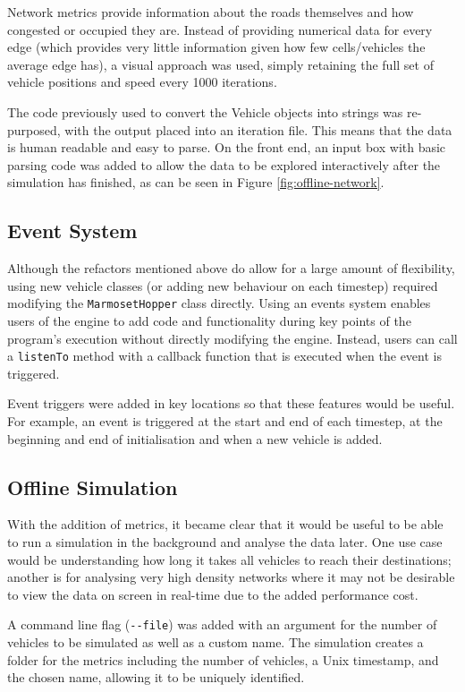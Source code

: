 \documentclass[ %
                    author={Alexander Hill},
                supervisor={Dr. Benjamin Sach},
                    degree={MEng},
                     title={MARMOSET},
                  subtitle={Multi-Agent Route Management using Online Simulation for Efficient Transportation},
                      type={research},
                      year={2016} ]{dissertation}
\begin{document}
Network metrics provide information about the roads themselves and how congested
or occupied they are. Instead of providing numerical data for every edge (which
provides very little information given how few cells/vehicles the average edge
has), a visual approach was used, simply retaining the full set of vehicle
positions and speed every 1000 iterations.

The code previously used to convert the Vehicle objects into strings was
re-purposed, with the output placed into an iteration file. This means that the
data is human readable and easy to parse. On the front end, an input box with
basic parsing code was added to allow the data to be explored interactively
after the simulation has finished, as can be seen in Figure
\ref{fig:offline-network}.

\subsection{Event System}

Although the refactors mentioned above do allow for a large amount of
flexibility, using new vehicle classes (or adding new behaviour on each
timestep) required modifying the \texttt{MarmosetHopper} class directly. Using
an events system enables users of the engine to add code and functionality
during key points of the program's execution without directly modifying the
engine.  Instead, users can call a \texttt{listenTo} method with a callback
function that is executed when the event is triggered.

Event triggers were added in key locations so that these features would be
useful. For example, an event is triggered at the start and end of each
timestep, at the beginning and end of initialisation and when a new vehicle is
added.

\subsection{Offline Simulation}

With the addition of metrics, it became clear that it would be useful to be able
to run a simulation in the background and analyse the data later. One use case
would be understanding how long it takes all vehicles to reach their
destinations; another is for analysing very high density networks where it may
not be desirable to view the data on screen in real-time due to the added
performance cost.

A command line flag (\texttt{-{}-file}) was added with an argument for the
number of vehicles to be simulated as well as a custom name. The simulation
creates a folder for the metrics including the number of vehicles, a Unix
timestamp, and the chosen name, allowing it to be uniquely identified.
\end{document}
